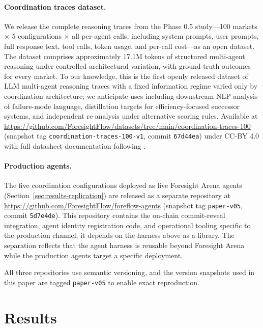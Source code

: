 \documentclass[11pt]{article}
\begin{document}
\paragraph{Coordination traces dataset.} We release the complete reasoning traces from the Phase 0.5 study---100 markets $\times$ 5 configurations $\times$ all per-agent calls, including system prompts, user prompts, full response text, tool calls, token usage, and per-call cost---as an open dataset. The dataset comprises approximately 17.1M tokens of structured multi-agent reasoning under controlled architectural variation, with ground-truth outcomes for every market. To our knowledge, this is the first openly released dataset of LLM multi-agent reasoning traces with a fixed information regime varied only by coordination architecture; we anticipate uses including downstream NLP analysis of failure-mode language, distillation targets for efficiency-focused successor systems, and independent re-analysis under alternative scoring rules. Available at \url{https://github.com/ForesightFlow/datasets/tree/main/coordination-traces-100} (snapshot tag \texttt{coordination-traces-100-v1}, commit \texttt{67d44ea}) under CC-BY 4.0 with full datasheet documentation following \citet{gebru2021datasheets}.

\paragraph{Production agents.} The five coordination configurations deployed as live Foresight Arena agents (Section~\ref{sec:results-replication}) are released as a separate repository at \url{https://github.com/ForesightFlow/foreflow-agents} (snapshot tag \texttt{paper-v05}, commit \texttt{5d7e4de}). This repository contains the on-chain commit-reveal integration, agent identity registration code, and operational tooling specific to the production channel; it depends on the harness above as a library. The separation reflects that the agent harness is reusable beyond Foresight Arena while the production agents target a specific deployment.

All three repositories use semantic versioning, and the version snapshots used in this paper are tagged \texttt{paper-v05} to enable exact reproduction.

\section{Results}
\label{sec:results}
\end{document}
